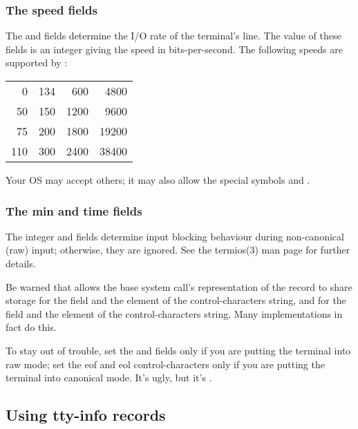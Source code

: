
\subsubsection{The speed fields}
The  and  fields determine the
I/O rate of the terminal's line.
The value of these fields is an integer giving the speed
in bits-per-second.
The following speeds are supported by {\Posix}:
\begin{center}
\begin{tabular}{rrrr}
0        & 134 & 600  & 4800  \\
50       & 150 & 1200 & 9600  \\
75       & 200 & 1800 & 19200 \\
110      & 300 & 2400 & 38400 \\
\end{tabular}
\end{center}
Your OS may accept others; it may also allow the special symbols
 and .

\subsubsection{The min and time fields}
The integer  and  fields determine input blocking
behaviour during non-canonical (raw) input; otherwise, they are ignored.
See the termios(3) man page for further details.

Be warned that {\Posix} allows the base system call's representation
of the  record to share storage for the  field
and the  element of the control-characters string,
and for the  field and the  element
of the control-characters string.
Many implementations in fact do this.

To stay out of trouble, set the  and  fields only
if you are putting the terminal into raw mode;
set the eof and eol control-characters only if you are putting
the terminal into canonical mode.
It's ugly, but it's {\Unix}.

\subsection{Using tty-info records}

